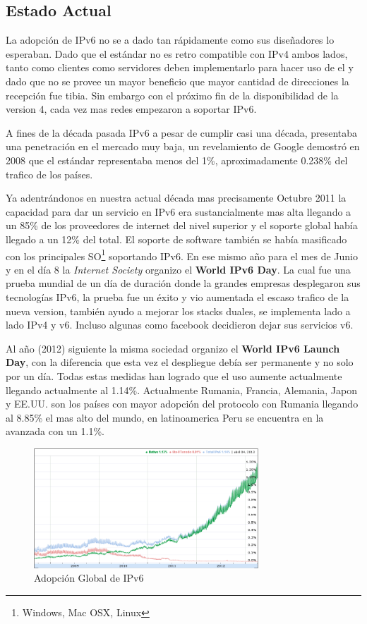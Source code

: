 \documentclass[11pt,a4paper]{article}
\begin{document}
\subsection{Estado Actual}
La adopción de IPv6 no se a dado tan rápidamente como sus diseñadores lo esperaban. Dado que el 
estándar no es retro compatible con IPv4 ambos lados, tanto como clientes como servidores deben 
implementarlo para hacer uso de el y dado que no se provee un mayor beneficio que mayor cantidad de 
direcciones la recepción fue tibia. Sin embargo con el próximo fin de la disponibilidad de la 
version 4, cada vez mas redes empezaron a soportar IPv6.\par
A fines de la década pasada IPv6 a pesar de cumplir casi una década, presentaba una penetración en 
el mercado muy baja, un revelamiento de Google demostró en 2008 que el estándar representaba menos
del 1\%, aproximadamente 0.238\% del trafico de los países\cite{googleIPv6}.\par
Ya adentrándonos en nuestra actual década mas precisamente Octubre 2011 la capacidad para dar un 
servicio en IPv6 era sustancialmente mas alta llegando a un 85\% de los proveedores de internet del 
nivel superior y el soporte global había llegado a un 12\% del total. El soporte de software también 
se había masificado con los principales SO\footnote{Windows, Mac OSX, Linux} soportando IPv6. En ese 
mismo año para el mes de Junio y en el día 8 la \emph{Internet Society} organizo el \textbf{World 
IPv6 Day}. La cual fue una prueba mundial de un día de duración donde la grandes empresas 
desplegaron sus tecnologías IPv6, la prueba fue un éxito y vio aumentada el escaso trafico de la 
nueva version, también ayudo a mejorar los stacks duales, se implementa lado a lado IPv4 y v6. 
Incluso algunas como facebook decidieron dejar sus servicios v6.\par
Al año (2012) siguiente la misma sociedad organizo el \textbf{World IPv6 Launch Day}, con la 
diferencia que esta vez el despliegue debía ser permanente y no solo por un día. Todas estas medidas 
han logrado que el uso aumente actualmente llegando actualmente al 1.14\%. Actualmente Rumania, 
Francia, Alemania, Japon y EE.UU. son los países con mayor adopción del protocolo con Rumania 
llegando al 8.85\% el mas alto del mundo, en latinoamerica Peru se encuentra en la avanzada con un 
1.1\%.
\begin{figure}[h!]
 \centering
 \includegraphics[width=0.75\textwidth]{adopcionIPv6.png}
 \caption[Adopción Global de IPv6]{Adopción Global de IPv6}
\end{figure}
\end{document}
